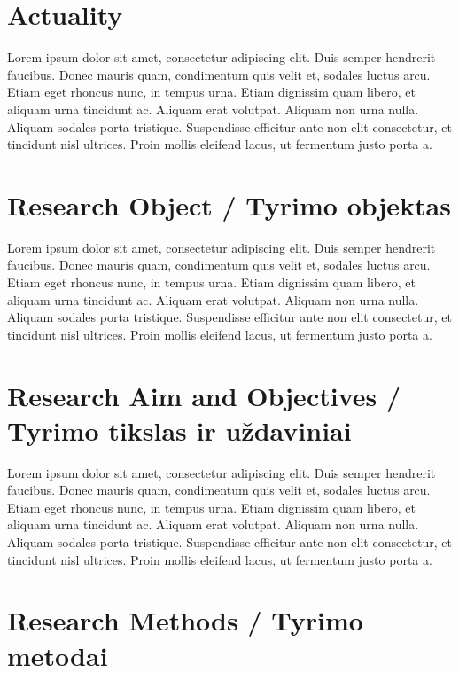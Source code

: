 \section*{Actuality}

Lorem ipsum dolor sit amet, consectetur adipiscing elit. Duis semper hendrerit faucibus. Donec mauris quam, condimentum quis velit et, sodales luctus arcu. Etiam eget rhoncus nunc, in tempus urna. Etiam dignissim quam libero, et aliquam urna tincidunt ac. Aliquam erat volutpat. Aliquam non urna nulla. Aliquam sodales porta tristique. Suspendisse efficitur ante non elit consectetur, et tincidunt nisl ultrices. Proin mollis eleifend lacus, ut fermentum justo porta a.


\section*{Research Object / Tyrimo objektas}

Lorem ipsum dolor sit amet, consectetur adipiscing elit. Duis semper hendrerit faucibus. Donec mauris quam, condimentum quis velit et, sodales luctus arcu. Etiam eget rhoncus nunc, in tempus urna. Etiam dignissim quam libero, et aliquam urna tincidunt ac. Aliquam erat volutpat. Aliquam non urna nulla. Aliquam sodales porta tristique. Suspendisse efficitur ante non elit consectetur, et tincidunt nisl ultrices. Proin mollis eleifend lacus, ut fermentum justo porta a.


\section*{Research Aim and Objectives / Tyrimo tikslas ir uždaviniai}

Lorem ipsum dolor sit amet, consectetur adipiscing elit. Duis semper hendrerit faucibus. Donec mauris quam, condimentum quis velit et, sodales luctus arcu. Etiam eget rhoncus nunc, in tempus urna. Etiam dignissim quam libero, et aliquam urna tincidunt ac. Aliquam erat volutpat. Aliquam non urna nulla. Aliquam sodales porta tristique. Suspendisse efficitur ante non elit consectetur, et tincidunt nisl ultrices. Proin mollis eleifend lacus, ut fermentum justo porta a.


\section*{Research Methods / Tyrimo metodai}

